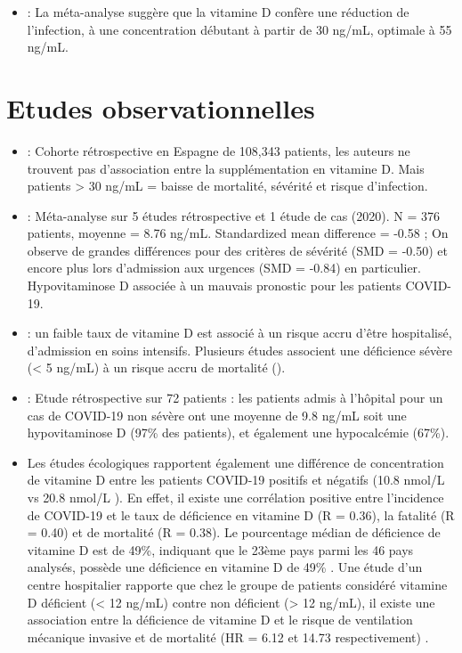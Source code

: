 \documentclass[
  a4paper,
  DIV=11,
  numbers=noendperiod,
  listof=totoc]{scrreprt}
\providecommand{\tightlist}{%
  \setlength{\itemsep}{0pt}\setlength{\parskip}{0pt}}\usepackage{longtable,booktabs,array}
\begin{document}
\begin{itemize}
\tightlist
\item
  \textcite{Borsche.2021}: La méta-analyse suggère que la vitamine D
  confère une réduction de l'infection, à une concentration débutant à
  partir de 30 ng/mL, optimale à 55 ng/mL.
\end{itemize}

\section{Etudes observationnelles}\label{etudes-observationnelles}

\begin{itemize}
\item
  \textcite{Oristrell.2022} : Cohorte rétrospective en Espagne de
  108,343 patients, les auteurs ne trouvent pas d'association entre la
  supplémentation en vitamine D. Mais patients \textgreater{} 30 ng/mL =
  baisse de mortalité, sévérité et risque d'infection.
\item
  \textcite{Munshi.2021} : Méta-analyse sur 5 études rétrospective et 1
  étude de cas (2020). N = 376 patients, moyenne = 8.76 ng/mL.
  Standardized mean difference = -0.58 ; On observe de grandes
  différences pour des critères de sévérité (SMD = -0.50) et encore plus
  lors d'admission aux urgences (SMD = -0.84) en particulier.
  Hypovitaminose D associée à un mauvais pronostic pour les patients
  COVID-19.
\item
  \textcite{Campi.2021} : un faible taux de vitamine D est associé à un
  risque accru d'être hospitalisé, d'admission en soins intensifs.
  Plusieurs études associent une déficience sévère (\textless{} 5 ng/mL)
  à un risque accru de mortalité ().
\item
  \textcite{Pal.2021} : Etude rétrospective sur 72 patients : les
  patients admis à l'hôpital pour un cas de COVID-19 non sévère ont une
  moyenne de 9.8 ng/mL soit une hypovitaminose D (97\% des patients), et
  également une hypocalcémie (67\%).
\item
  Les études écologiques rapportent également une différence de
  concentration de vitamine D entre les patients COVID-19 positifs et
  négatifs (10.8 nmol/L vs 20.8 nmol/L \autocite{Baktash.2021}). En
  effet, il existe une corrélation positive entre l'incidence de
  COVID-19 et le taux de déficience en vitamine D (R = 0.36), la
  fatalité (R = 0.40) et de mortalité (R = 0.38). Le pourcentage médian
  de déficience de vitamine D est de 49\%, indiquant que le 23ème pays
  parmi les 46 pays analysés, possède une déficience en vitamine D de
  49\% \autocite{Mariani.2021}. Une étude d'un centre hospitalier
  rapporte que chez le groupe de patients considéré vitamine D déficient
  (\textless{} 12 ng/mL) contre non déficient (\textgreater{} 12 ng/mL),
  il existe une association entre la déficience de vitamine D et le
  risque de ventilation mécanique invasive et de mortalité (HR = 6.12 et
  14.73 respectivement) \autocite{Radujkovic.2020}.
\end{itemize}
\end{document}
